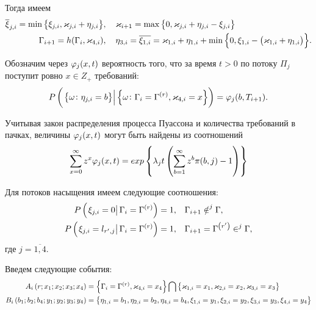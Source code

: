 \documentclass[a4paper,14pt,russian]{article}
\newcommand{\G}{\Gamma}
\renewcommand{\P}[2]{P\br{\left. #1 \right| #2}}
\newcommand{\ga}[1]{\Gamma^{\left( #1 \right)} }
\begin{document}
Тогда имеем
\begin{align}
\overline{\xi}_{j,i} = \min{\brrr{\xi_{j,i},\vk_{j,i}+\eta_{j,i}}}&,\quad \vk_{i+1}=\max{\brrr{0,\vk_{j,i}+\eta_{j,i}-\xi_{j,i}}}\nonumber \\
\G_{i+1}=h(\G_i,\vk_{4,i})&,\quad \eta_{3,i}=\overline{\xi_{1,i}} = \vk_{1,i}+\eta_{1,i} + \min{\brrr{0,\xi_{1,i} - \br{\vk_{1,i}+\eta_{1,i}}}}.
\label{deterministicLaw}
\end{align}

Обозначим через $\varphi_j(x,t)$ вероятность того, что за время $t>0$ по потоку $\Pi_j$ поступит ровно $x\in Z_+$ требований:
\begin{equation}
\P{\brrr{\omega\colon \eta_{j,i} = b}}{\brrr{\omega\colon \G_i=\ga{r}, \vk_{4,i}=x}}=\vp_j(b,T_{i+1}).
\end{equation}

Учитывая закон распределения процесса Пуассона и количества требований в пачках, величины $\varphi_j(x,t)$ могут быть найдены из соотношений
\begin{equation}
\sum_{x=0}^{\infty} z^x\varphi_j(x,t) = exp\left\{\lambda_j t \left(\sum_{b=1}^{\infty} z^b \pi(b,j) -1\right)\right\}
\end{equation}

Для потоков насыщения имеем следующие соотношения:
\begin{align}
\P{\xi_{j,i} = 0}{\G_i=\ga{r}} = 1, &\quad \G_{i+1}\notin ^j\G,\\
\P{\xi_{j,i} = l_{r',j}}{\G_i=\ga{r}} = 1, &\quad \G_{i+1}=\ga{r'}\in ^j\G,
\end{align}
где $j=\overline{1,4}$.

Введем следующие события:
\begin{align}
A_i\br{r;x_1;x_2;x_3;x_4} &= \brrr{\G_i=\ga{r},\vk_{4,i}=x_4}\bigcap \brrr{\vk_{1,i}=x_1,\vk_{2,i}=x_2,\vk_{3,i}=x_3}\\
B_i\br{b_1;b_2;b_4;y_1;y_2;y_3;y_4} &= \brrr{\eta_{1,i}=b_1,\eta_{2,i}=b_2,\eta_{4,i}=b_4,\xi_{1,i}=y_1,\xi_{2,i}=y_2,\xi_{3,i}=y_3,\xi_{4,i}=y_4}
\end{align}
\end{document}
